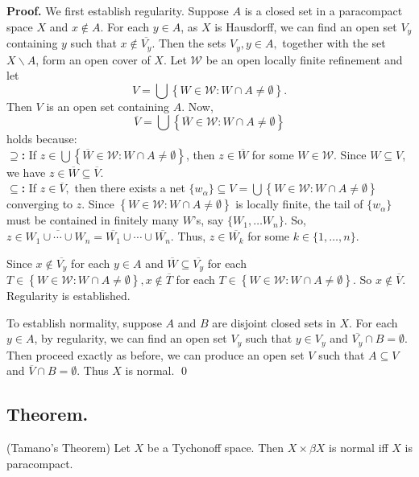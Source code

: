 \documentclass{article}
\begin{document}
\textbf{Proof.} We first establish regularity. Suppose $A$ is a closed set in a paracompact space $X$ and $x\notin A$. For each $y\in A$, as $X$ is Hausdorff, we can find an open set $V_y$ containing $y$ such that $x\notin \overline{V_y}$. Then the sets $V_y, y\in A,$ together with the set $X\backslash A$, form an open cover of $X$. Let $\mathcal{W}$ be an open locally finite refinement and let 
$$V=\bigcup\left\{ W\in \mathcal{W}: W\cap A\neq \emptyset\right\}.$$
\vskip 5pt
Then $V$ is an open set containing $A$. Now, 
$$\overline{V}=\bigcup\left\{ \overline{W}\in \mathcal{W}: W\cap A\neq \emptyset\right\}$$ holds because:\\
\textbf{$\supseteq$:} If $z\in \bigcup\left\{ \overline{W}\in \mathcal{W}: W\cap A\neq \emptyset\right\}$, then $z\in \overline{W}$ for some $W \in \mathcal{W}.$ Since $W\subseteq V$, we have $z\in \overline{W}\subseteq \overline{V}.$\\
\textbf{$\subseteq$:} If $z\in \overline{V},$ then there exists a net $\{w_\alpha\}\subseteq V=\bigcup\left\{ W\in \mathcal{W}: W\cap A\neq \emptyset\right\}$ converging to $z$. Since $\left\{W\in \mathcal{W}: W\cap A \neq \emptyset\right\}$ is locally finite, the tail of $\{w_\alpha\}$ must be contained in finitely many $W$'s, say $\{W_1,\dots W_n\}$. So, $z\in \overline{W_1 \cup \cdots \cup W_n}=\overline{W_1}\cup \cdots \cup \overline{W_n}.$ Thus, $z\in \overline{W_k}$ for some $k\in \{1,\dots ,n\}$.
\vskip 15pt

Since $x\notin \overline{V_y}$ for each $y\in A$ and $\overline{W}\subseteq \overline{V_y}$ for each $T\in \left\{W\in \mathcal{W}: W\cap A\neq \emptyset\right\}, x\notin \overline{T}$ for each $T\in \left\{W\in \mathcal{W}: W\cap A\neq \emptyset\right\}.$ So $x\notin \overline{V}.$ Regularity is established. 


\vskip 15pt

To establish normality, suppose $A$ and $B$ are disjoint closed sets in $X$. For each $y\in A$, by regularity, 
we can find an open set $V_y$ such that $y\in V_y$ and $\overline{V_y}\cap B= \emptyset$. Then proceed exactly as before, we can 
produce an open set $V$ such that $A\subseteq V$ and $\overline{V}\cap B=\emptyset.$ Thus $X$ is normal. \qed




\vskip 35pt



\subsection{Theorem.}
(Tamano's Theorem) Let $X$ be a Tychonoff space. Then $X \times \beta X$ is normal iff $X$ is paracompact. 
\end{document}
